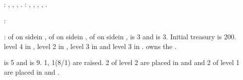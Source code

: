 : \provinceVeneto, \provinceMantova,
\provinceFriuli, \provinceIstria.
: \provinceDalmacija, \provinceCorfu, \provinceKreta,
\provinceCyclades, \provinceChypre.

:
\begin{modlist}
\item[\SUB] \paysmamelouks
\end{modlist}

:
\bparag \MNU of  on side\faceplus in \provinceVeneto, \MNU of
 on side\facemoins in \provinceVeneto, \MNU of  on
side\facemoins in \provinceChypre, \FTI is 3 and \DTI is 3.
\bparag Initial treasury is 200\ducats.
\bparag \TradeFLEET level 4 in , level 2 in , level 3
in  and level 3 in . \VEN owns the
.

\aparag {} is 5 and  is
9. 1\ARMY\facemoins, 1\FLEET\faceplus (8\NGD/1\NTD) are raised. 2 \Presidios
of level 2 are placed in \provinceMoreas and \provinceAlabania and 2 of level
1 are placed in \provinceHellas and \provinceMontenegro.


